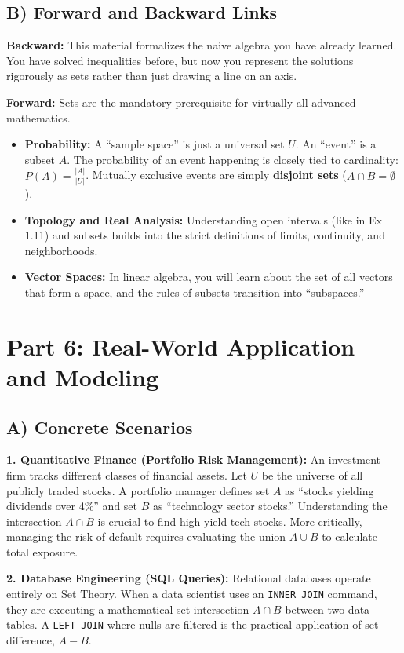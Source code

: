 \documentclass[12pt]{article}
\begin{document}
\subsection{B) Forward and Backward Links}
\textbf{Backward:} This material formalizes the naive algebra you have already learned. You have solved inequalities before, but now you represent the solutions rigorously as sets rather than just drawing a line on an axis.

\textbf{Forward:} Sets are the mandatory prerequisite for virtually all advanced mathematics. 
\begin{itemize}
    \item \textbf{Probability:} A ``sample space'' is just a universal set $U$. An ``event'' is a subset $A$. The probability of an event happening is closely tied to cardinality: $P(A) = \frac{|A|}{|U|}$. Mutually exclusive events are simply \textbf{disjoint sets} ($A \cap B = \emptyset$).
    \item \textbf{Topology and Real Analysis:} Understanding open intervals (like in Ex 1.11) and subsets builds into the strict definitions of limits, continuity, and neighborhoods.
    \item \textbf{Vector Spaces:} In linear algebra, you will learn about the set of all vectors that form a space, and the rules of subsets transition into ``subspaces.''
\end{itemize}

\newpage
\section{Part 6: Real-World Application and Modeling}

\subsection{A) Concrete Scenarios}
\textbf{1. Quantitative Finance (Portfolio Risk Management):}
An investment firm tracks different classes of financial assets. Let $U$ be the universe of all publicly traded stocks. A portfolio manager defines set $A$ as ``stocks yielding dividends over 4\%'' and set $B$ as ``technology sector stocks.'' Understanding the intersection $A \cap B$ is crucial to find high-yield tech stocks. More critically, managing the risk of default requires evaluating the union $A \cup B$ to calculate total exposure.

\textbf{2. Database Engineering (SQL Queries):}
Relational databases operate entirely on Set Theory. When a data scientist uses an \texttt{INNER JOIN} command, they are executing a mathematical set intersection $A \cap B$ between two data tables. A \texttt{LEFT JOIN} where nulls are filtered is the practical application of set difference, $A - B$.
\end{document}
